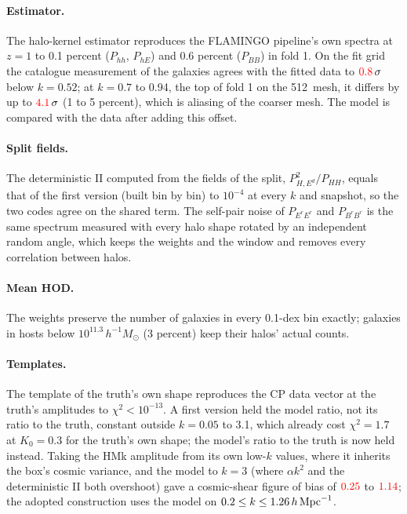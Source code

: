 \documentclass[11pt]{article}
\newcommand{\hMpc}{\,h\,{\rm Mpc}^{-1}}
\newcommand{\Msun}{\,h^{-1}M_\odot}
\newif\ifnumbersfinal
\newcommand{\refresh}[1]{\ifnumbersfinal#1\else\textcolor{red}{#1}\fi}
\newcommand{\Mcomp}{11.3}       %
\newcommand{\dlgM}{0.1}         %
\newcommand{\NGmesh}{512}           %
\newcommand{\Kfit}{1.26}        %
\begin{document}
\paragraph{Estimator.} The halo-kernel estimator reproduces the FLAMINGO
pipeline's own spectra at $z=1$ to 0.1 percent ($P_{hh}$, $P_{hE}$) and
0.6 percent ($P_{BB}$) in fold 1. On the fit grid the catalogue
measurement of the galaxies agrees with the fitted data to
$\refresh{\reproLow}\,\sigma$ below $k=0.52$; at $k=0.7$ to 0.94, the top of
fold 1 on the \NGmesh\ mesh, it differs by up to $\refresh{\reproHigh}\,\sigma$
(1 to 5 percent), which is aliasing of the coarser mesh. The model is
compared with the data after adding this offset.

\paragraph{Split fields.} The deterministic II computed from the fields of
the split, $P_{H,E^d}^2/P_{HH}$, equals that of the first version (built
bin by bin) to $10^{-4}$ at every $k$ and snapshot, so the two codes agree
on the shared term. The self-pair noise of $P_{E^rE^r}$ and $P_{B^rB^r}$
is the same spectrum measured with every halo shape rotated by an
independent random angle, which keeps the weights and the window and
removes every correlation between halos.

\paragraph{Mean HOD.} The weights preserve the number of galaxies in every
\dlgM-dex bin exactly; galaxies in hosts below $10^{\Mcomp}\Msun$ (3
percent) keep their halos' actual counts.

\paragraph{Templates.} The template of the truth's own shape reproduces
the CP data vector at the truth's amplitudes to $\chi^2<10^{-13}$. A first
version held the model ratio, not its ratio to the truth, constant
outside $k=0.05$ to 3.1, which already cost $\chi^2=1.7$ at $K_0=0.3$ for
the truth's own shape; the model's ratio to the truth is now held instead.
Taking the HMk amplitude from its own low-$k$ values, where it inherits the
box's cosmic variance, and the model to $k=3$ (where $\alpha k^2$ and the
deterministic II both overshoot) gave a cosmic-shear figure of bias of
$\refresh{\fobVoneCsWgTwo}$ to $\refresh{\fobVoneCsWgEight}$; the adopted
construction uses the model on $0.2\le k\le\Kfit\hMpc$.
\end{document}
